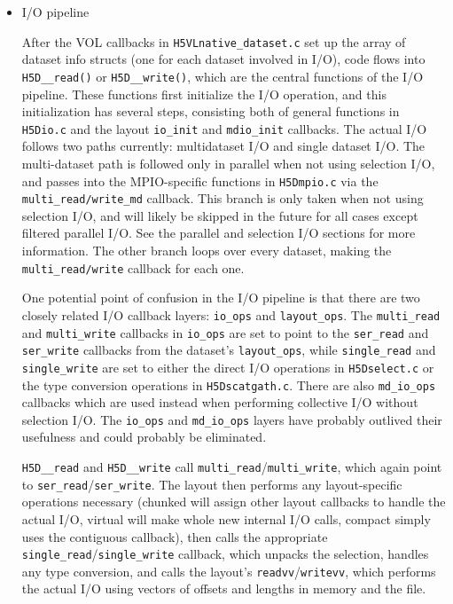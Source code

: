 \begin{itemize}
    \item I/O pipeline

After the VOL callbacks in \texttt{H5VLnative\_dataset.c} set up the array of dataset info structs (one for each dataset involved in I/O), code flows into \texttt{H5D\_\_read()} or \texttt{H5D\_\_write()}, which are the central functions of the I/O pipeline. These functions first initialize the I/O operation, and this initialization has several steps, consisting both of general functions in \texttt{H5Dio.c} and the layout \texttt{io\_init} and \texttt{mdio\_init} callbacks. The actual I/O follows two paths currently: multidataset I/O and single dataset I/O. The multi-dataset path is followed only in parallel when not using selection I/O, and passes into the MPIO-specific functions in \texttt{H5Dmpio.c} via the \texttt{multi\_read/write\_md} callback. This branch is only taken when not using selection I/O, and will likely be skipped in the future for all cases except filtered parallel I/O. See the parallel and selection I/O sections for more information. The other branch loops over every dataset, making the \texttt{multi\_read/write} callback for each one.

One potential point of confusion in the I/O pipeline is that there are two closely related I/O callback layers: \texttt{io\_ops} and \texttt{layout\_ops}. The \texttt{multi\_read} and \texttt{multi\_write} callbacks in \texttt{io\_ops} are set to point to the \texttt{ser\_read} and \texttt{ser\_write} callbacks from the dataset's \texttt{layout\_ops}, while \texttt{single\_read} and \texttt{single\_write} are set to either the direct I/O operations in \texttt{H5Dselect.c} or the type conversion operations in \texttt{H5Dscatgath.c}. There are also \texttt{md\_io\_ops} callbacks which are used instead when performing collective I/O without selection I/O. The \texttt{io\_ops} and \texttt{md\_io\_ops} layers have probably outlived their usefulness and could probably be eliminated.

\texttt{H5D\_\_read{}} and \texttt{H5D\_\_write} call \texttt{multi\_read}/\texttt{multi\_write}, which again point to \texttt{ser\_read}/\texttt{ser\_write}. The layout then performs any layout-specific operations necessary (chunked will assign other layout callbacks to handle the actual I/O, virtual will make whole new internal I/O calls, compact simply uses the contiguous callback), then calls the appropriate \texttt{single\_read}/\texttt{single\_write} callback, which unpacks the selection, handles any type conversion, and calls the layout's \texttt{readvv}/\texttt{writevv}, which performs the actual I/O using vectors of offsets and lengths in memory and the file.


\end{itemize}
